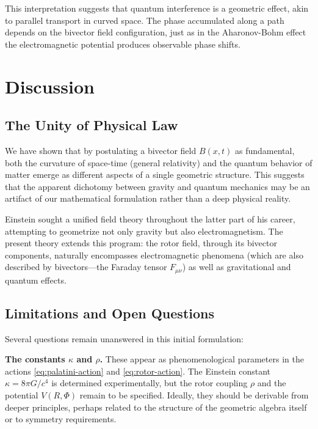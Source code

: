 \documentclass[11pt,a4paper]{article}
\numberwithin{equation}{section}
\theoremstyle{plain}
\theoremstyle{definition}
\theoremstyle{remark}
\begin{document}
This interpretation suggests that quantum interference is a geometric effect, akin to parallel transport in curved space. The phase accumulated along a path depends on the bivector field configuration, just as in the Aharonov-Bohm effect the electromagnetic potential produces observable phase shifts.

\section{Discussion}
\label{sec:discussion}

\subsection{The Unity of Physical Law}

We have shown that by postulating a bivector field $B(x,t)$ as fundamental, both the curvature of space-time (general relativity) and the quantum behavior of matter emerge as different aspects of a single geometric structure. This suggests that the apparent dichotomy between gravity and quantum mechanics may be an artifact of our mathematical formulation rather than a deep physical reality.

Einstein sought a unified field theory throughout the latter part of his career, attempting to geometrize not only gravity but also electromagnetism. The present theory extends this program: the rotor field, through its bivector components, naturally encompasses electromagnetic phenomena (which are also described by bivectors---the Faraday tensor $F_{\mu\nu}$) as well as gravitational and quantum effects.

\subsection{Limitations and Open Questions}

Several questions remain unanswered in this initial formulation:

\textbf{The constants $\kappa$ and $\rho$.} These appear as phenomenological parameters in the actions \eqref{eq:palatini-action} and \eqref{eq:rotor-action}. The Einstein constant $\kappa = 8\pi G/c^4$ is determined experimentally, but the rotor coupling $\rho$ and the potential $V(R,\Phi)$ remain to be specified. Ideally, they should be derivable from deeper principles, perhaps related to the structure of the geometric algebra itself or to symmetry requirements.
\end{document}
